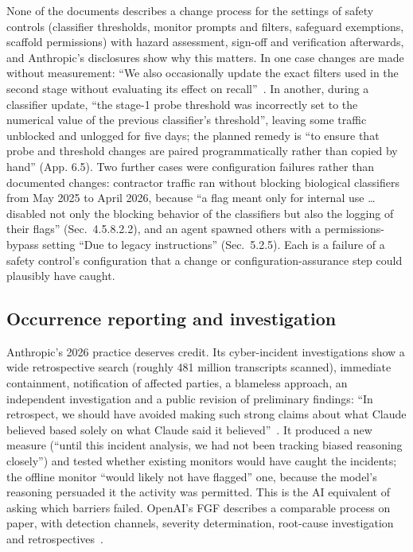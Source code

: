 \documentclass[11pt]{article}
\begin{document}
None of the documents describes a change process for the settings of safety controls (classifier thresholds, monitor prompts and filters, safeguard exemptions, scaffold permissions) with hazard assessment, sign-off and verification afterwards, and Anthropic's disclosures show why this matters. In one case changes are made without measurement: ``We also occasionally update the exact filters used in the second stage without evaluating its effect on recall''~\cite[Sec.~2.23.1.2]{anthropic2026riskreport}. In another, during a classifier update, ``the stage-1 probe threshold was incorrectly set to the numerical value of the previous classifier's threshold'', leaving some traffic unblocked and unlogged for five days; the planned remedy is ``to ensure that probe and threshold changes are paired programmatically rather than copied by hand'' (App. 6.5). Two further cases were configuration failures rather than documented changes: contractor traffic ran without blocking biological classifiers from May 2025 to April 2026, because ``a flag meant only for internal use \ldots{} disabled not only the blocking behavior of the classifiers but also the logging of their flags'' (Sec.~4.5.8.2.2), and an agent spawned others with a permissions-bypass setting ``Due to legacy instructions'' (Sec.~5.2.5). Each is a failure of a safety control's configuration that a change or configuration-assurance step could plausibly have caught.

\subsection{Occurrence reporting and investigation}\label{sec:gap-occurrence}

Anthropic's 2026 practice deserves credit. Its cyber-incident investigations show a wide retrospective search (roughly 481 million transcripts scanned), immediate containment, notification of affected parties, a blameless approach, an independent investigation and a public revision of preliminary findings: ``In retrospect, we should have avoided making such strong claims about what Claude believed based solely on what Claude said it believed''~\cite{anthropic2026cyberassessment}. It produced a new measure (``until this incident analysis, we had not been tracking biased reasoning closely'') and tested whether existing monitors would have caught the incidents; the offline monitor ``would likely not have flagged'' one, because the model's reasoning persuaded it the activity was permitted. This is the AI equivalent of asking which barriers failed. OpenAI's FGF describes a comparable process on paper, with detection channels, severity determination, root-cause investigation and retrospectives~\cite[Sec.~2.6]{openaiFGF}.
\end{document}
